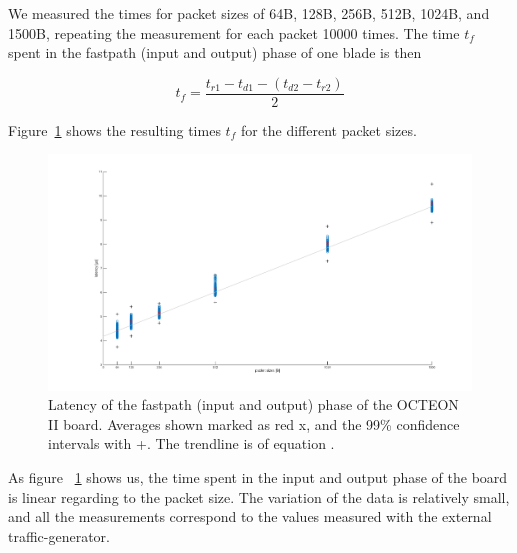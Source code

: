 We measured the times for packet sizes of 64B, 128B, 256B, 512B, 1024B, and 1500B, repeating the measurement for each packet 10000 times. The time $t_{f}$ spent in the fastpath (input and output) phase of one blade is then

\begin{equation}
  \label{eq:1}
  t_{f} = \frac{t_{r1} - t_{d1} - (t_{d2} - t_{r2})}{2}
\end{equation}

Figure~\ref{fig:comm-latency} shows the resulting times $t_{f}$ for the different packet sizes.

\begin{figure}[h]
  \begin{center}
    \includegraphics[width=\textwidth]{images/comm-latency.pdf}
    \caption{Latency of the fastpath (input and output) phase of the OCTEON II board. Averages shown marked as red x, and the 99\%  confidence intervals with +. The trendline is of equation .}
    \label{fig:comm-latency}
  \end{center}
\end{figure}

As figure ~\ref{fig:comm-latency} shows us, the time spent in the input and output phase of the board is linear regarding to the packet size. The variation of the data is relatively small, and all the measurements correspond to the values measured with the external traffic-generator.


